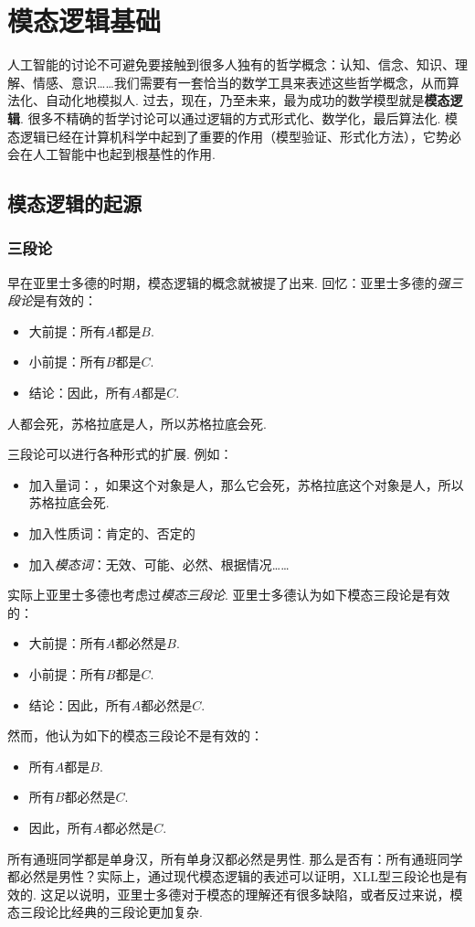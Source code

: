 \chapter{模态逻辑基础}\label{chap:modal-logic}

 人工智能的讨论不可避免要接触到很多人独有的哲学概念：认知、信念、知识、理解、情感、意识……我们需要有一套恰当的数学工具来表述这些哲学概念，从而算法化、自动化地模拟人. 过去，现在，乃至未来，最为成功的数学模型就是\textbf{模态逻辑}. 很多不精确的哲学讨论可以通过逻辑的方式形式化、数学化，最后算法化. 模态逻辑已经在计算机科学中起到了重要的作用（模型验证、形式化方法），它势必会在人工智能中也起到根基性的作用.
    
\section{模态逻辑的起源}
\subsection{三段论}

早在亚里士多德的时期，模态逻辑的概念就被提了出来. 回忆：亚里士多德的\emph{强三段论}是有效的：
\begin{itemize}
    \item 大前提：所有$A$都是$B$.
    \item 小前提：所有$B$都是$C$.
    \item 结论：因此，所有$A$都是$C$.
\end{itemize}
人都会死，苏格拉底是人，所以苏格拉底会死.

三段论可以进行各种形式的扩展. 例如：
\begin{itemize}
    \item 加入量词：，如果这个对象是人，那么它会死，苏格拉底这个对象是人，所以苏格拉底会死.
    \item 加入性质词：肯定的、否定的
    \item 加入\emph{模态词}：无效、可能、必然、根据情况……
\end{itemize}
    
实际上亚里士多德也考虑过\emph{模态三段论}. 亚里士多德认为如下模态三段论是有效的：%
\begin{itemize}
    \item 大前提：所有$A$都必然是$B$.
    \item 小前提：所有$B$都是$C$.
    \item 结论：因此，所有$A$都必然是$C$.
\end{itemize}
然而，他认为如下的模态三段论不是有效的：
\begin{itemize}
\item 所有$A$都是$B$.
\item 所有$B$都必然是$C$.
\item 因此，所有$A$都必然是$C$.
\end{itemize}
所有通班同学都是单身汉，所有单身汉都必然是男性. 那么是否有：所有通班同学都必然是男性？实际上，通过现代模态逻辑的表述可以证明，XLL型三段论也是有效的. 这足以说明，亚里士多德对于模态的理解还有很多缺陷，或者反过来说，模态三段论比经典的三段论更加复杂.
    
